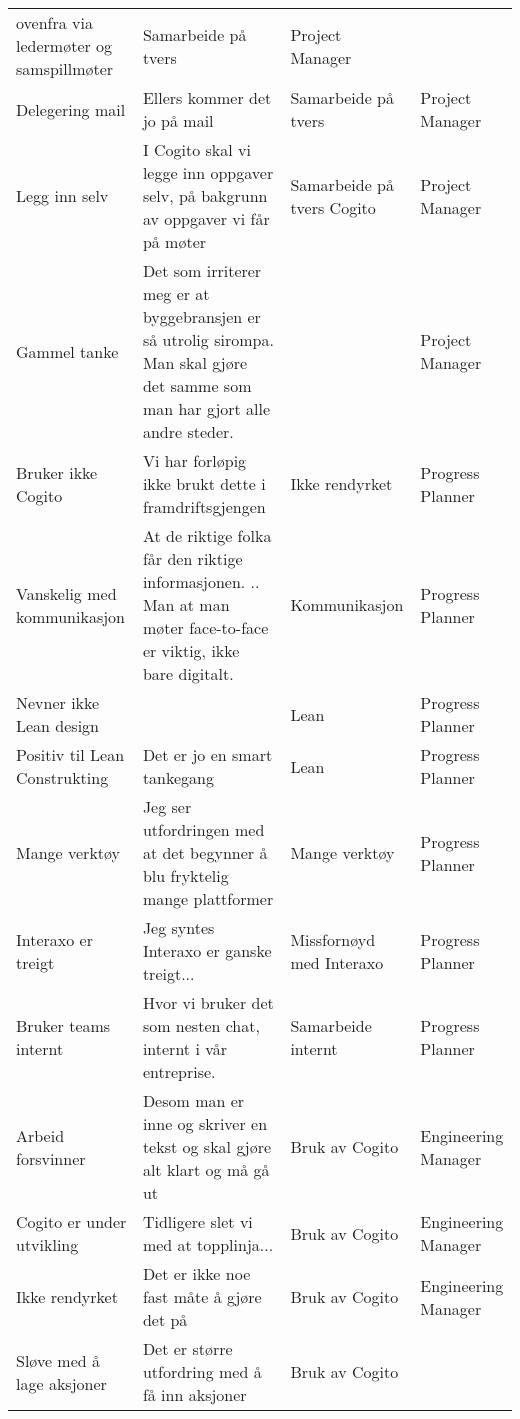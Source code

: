 \begin{landscape}
\begin{longtable}{p{0.25\textheight}p{0.5\textheight}p{0.25\textheight}p{0.25\textheight}}
      ovenfra via ledermøter og samspillmøter &
      Samarbeide på tvers &
      Project Manager \\
    Delegering mail &
      Ellers kommer det jo på mail &
      Samarbeide på tvers &
      Project Manager \\
    Legg inn selv &
      I Cogito skal vi legge inn oppgaver selv, på bakgrunn av oppgaver vi får på møter &
      Samarbeide på tvers Cogito &
      Project Manager \\
    Gammel tanke &
      Det som irriterer meg er at byggebransjen er så utrolig sirompa. Man skal gjøre det samme som man har gjort alle andre steder. &
       &
      Project Manager \\
    Bruker ikke Cogito &
      Vi har forløpig ikke brukt dette i framdriftsgjengen &
      Ikke rendyrket &
      Progress Planner \\
    Vanskelig med kommunikasjon &
      At de riktige folka får den riktige informasjonen. .. Man at man møter face-to-face er viktig, ikke bare digitalt. &
      Kommunikasjon &
      Progress Planner \\
    Nevner ikke Lean design &
       &
      Lean &
      Progress Planner \\
    Positiv til Lean Construkting &
      Det er jo en smart tankegang &
      Lean &
      Progress Planner \\
    Mange verktøy &
      Jeg ser utfordringen med at det begynner å blu fryktelig mange plattformer &
      Mange verktøy &
      Progress Planner \\
    Interaxo er treigt &
      Jeg syntes Interaxo er ganske treigt... &
      Missfornøyd med Interaxo &
      Progress Planner \\
    Bruker teams internt &
      Hvor vi bruker det som nesten chat, internt i vår entreprise. &
      Samarbeide internt &
      Progress Planner \\
    Arbeid forsvinner &
      Desom man er inne og skriver en tekst og skal gjøre alt klart og må gå ut &
      Bruk av Cogito &
      Engineering Manager \\
    Cogito er under utvikling &
      Tidligere slet vi med at topplinja... &
      Bruk av Cogito &
      Engineering Manager \\
    Ikke rendyrket &
      Det er ikke noe fast måte å gjøre det på &
      Bruk av Cogito &
      Engineering Manager \\
    Sløve med å lage aksjoner &
      Det er større utfordring med å få inn aksjoner &
      Bruk av Cogito &

\end{longtable}
\end{landscape}
